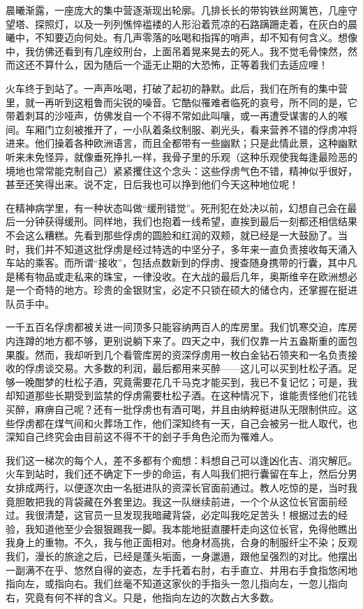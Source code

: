 \documentclass[11pt,oneside]{book}
\begin{document}
\begin{common-format}
晨曦渐露，一座庞大的集中营逐渐现出轮廓。几排长长的带钩铁丝网篱笆，几座守望塔、探照灯，以及一列列憔悴褴褛的人形沿着荒凉的石路蹒跚走着，在灰白的晨曦中，不知要迈向何处。有几声零落的吆喝和指挥的哨声，却不知有何含义。想像中，我仿佛还看到有几座绞刑台，上面吊着晃来晃去的死人。我不觉毛骨悚然，然而这还不算什么，因为随后一个遥无止期的大恐怖，正等着我们去适应哩！

火车终于到站了。一声声吆喝，打破了起初的静默。此后，我们在所有的集中营里，就一再听到这粗鲁而尖锐的噪音。它酷似罹难者临死的哀号，所不同的是，它带着刺耳的沙哑声，仿佛发自一个不得不常如此叫嚷，或一再遭受谋害的人的喉间。车厢门立刻被推开了，一小队着条纹制服、剃光头，看来营养不错的俘虏冲将进来。他们操着各种欧洲语言，而且全都带有一些幽默；只是此情此景，这种幽默听来未免怪异，就像垂死挣扎一样，我骨子里的乐观（这种乐观使我每逢最险恶的境地也常常能克制自己）紧紧攫住这个念头：这些俘虏气色不错，精神似乎很好，甚至还笑得出来。说不定，日后我也可以挣到他们今天这种地位呢！

在精神病学里，有一种状态叫做“缓刑错觉”。死刑犯在处决以前，幻想自己会在最后一分钟获得缓刑。同样地，我们也抱着一线希望，直挨到最后一刻都还相信结果不会这么糟糕。先看到那些俘虏的圆脸和红润的双颊，就已经是一大鼓励了。当时，我们并不知道这批俘虏是经过特选的中坚分子，多年来一直负责接收每天涌入车站的乘客。而所谓“接收”，包括点数新到的俘虏、搜查随身携带的行囊，其中凡是稀有物品或走私来的珠宝，一律没收。在大战的最后几年，奥斯维辛在欧洲想必是一个奇特的地方。珍贵的金银财宝，必定不只锁在硕大的储仓内，还掌握在挺进队员手中。

一千五百名俘虏都被关进一间顶多只能容纳两百人的库房里。我们饥寒交迫，库房内连蹲的地方都不够，更别说躺下来了。四天之中，我们仅靠一片五盎斯重的面包果腹。然而，我却听到几个看管库房的资深俘虏用一枚白金钻石领夹和一名负责接收的俘虏谈交易。大多数的利润，最后都用来买醉——这儿可以买到杜松子酒。足够一晚酣梦的杜松子酒，究竟需要花几千马克才能买到，我已不复记忆；可是，我却知道那些长期受到监禁的俘虏需要杜松子酒。在这种情况下，谁能责怪他们花钱买醉，麻痹自己呢？还有一批俘虏也有酒可喝，并且由纳粹挺进队无限制供应。这些俘虏都在煤气间和火葬场工作，他们深知终有一天，自己会被另一批人取代，也深知自己终究会由目前这不得不干的刽子手角色沦而为罹难人。

我们这一梯次的每个人，差不多都有个痴想：料想自己可以逢凶化吉、消灾解厄。火车到站时，我们还不确定下一步的命运，有人叫我们把行囊留在车上，然后分男女排成两行，以便逐次由一名挺进队的资深长官面前通过。教人吃惊的是，当时我竟胆敢把我的背袋藏在外套里边。我这一队继续前进，一个个从这位长官面前经过。我很清楚，这官员一旦发现我暗藏背袋，必定叫我吃足苦头！根据过去的经验，我知道他至少会狠狠踢我一脚。我本能地挺直腰杆走向这位长官，免得他瞧出我身上的重物。不久，我与他正面相对。他身材高挑，合身的制服纤尘不染；反观我们，漫长的旅途之后，已经是蓬头垢面，一身邋遢，跟他呈强烈的对比。他摆出一副满不在乎、悠然自得的姿态，左手托着右肘，右手直立、并用右手食指悠闲地指向左，或指向右。我们丝毫不知道这家伙的手指头一忽儿指向左，一忽儿指向右，究竟有何不祥的含义。只是，他指向左边的次数占大多数。


\end{common-format}
\end{document}

